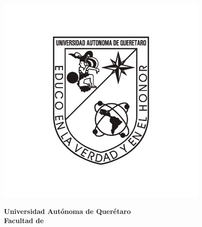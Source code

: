     \begin{minipage}[H][\textheight][c]{0.8\textwidth}
    
        \begin{tcolorbox}[colframe=black, colback=white, rounded corners, boxrule=0.5mm, width=\linewidth, height=\textheight, valign=center]
            \begin{minipage}[t][3cm][c]{0.2\textwidth}

            \vspace{2cm}
                \includegraphics[width=\linewidth]{figures/logo_UAQ.png} %
            \end{minipage}
            \hfill
            \begin{minipage}[t][3cm][c]{0.7\textwidth}
                \begin{center}
                \vspace{2cm}
                    {\Large \textbf{Universidad Autónoma de Querétaro}} \\
                    \vspace{0.2cm}
                    {\large \textbf{Facultad de \underline{\hspace{3cm}}}} \\
                \end{center}
            \end{minipage}
            

\end{tcolorbox}
\end{minipage}
